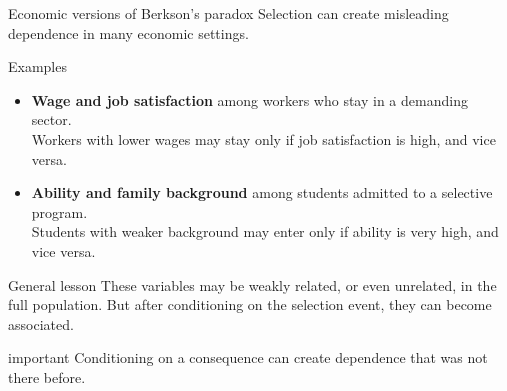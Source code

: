 \documentclass[dvipsnames,aspectratio=169,handout]{beamer}
\begin{document}
\begin{frame}{Economic versions of Berkson's paradox}
Selection can create misleading dependence in many economic settings.

\begin{block}{Examples}
\begin{itemize}
    \item \textbf{Wage and job satisfaction} among workers who \alert{stay} in a demanding sector.  \\
    {\small Workers with lower wages may stay only if job satisfaction is high, and vice versa.}


    \item \textbf{Ability and family background} among students \alert{admitted} to a selective program. \\ 
    {\small Students with weaker background may enter only if ability is very high, and vice versa.}
\end{itemize}
\end{block}

\begin{alertblock}{General lesson}
These variables may be weakly related, or even unrelated, in the full population.
But after conditioning on the selection event, they can become associated.
\end{alertblock}

\begin{beamercolorbox}[wd=\textwidth,sep=7pt,center,rounded=true,shadow=true]{important}
Conditioning on a consequence can create dependence that was not there before.
\end{beamercolorbox}
\end{frame}
\end{document}
